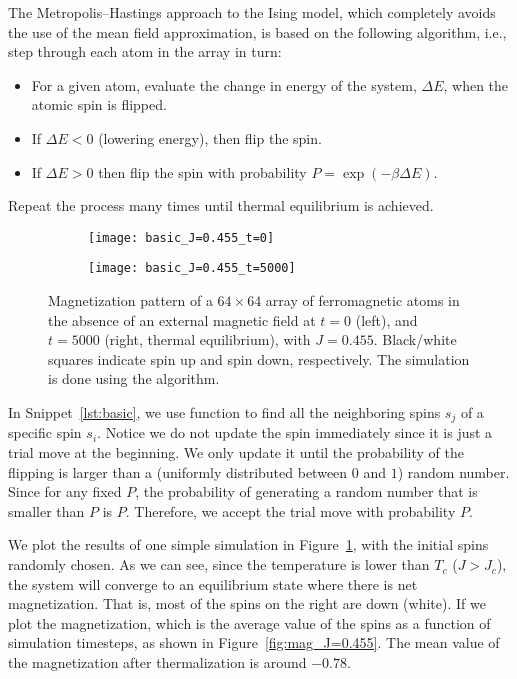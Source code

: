 The Metropolis--Hastings approach to the Ising model, which completely avoids the use of the mean
field approximation, is based on the following algorithm, i.e.,
step through each atom in the array in turn:
%
\begin{itemize}
    \item For a given atom, evaluate the change in energy of the system, \(\Delta E\), when
          the atomic spin is flipped.
    \item If \(\Delta E < 0\) (lowering energy), then flip the spin.
    \item If \(\Delta E > 0\) then flip the spin with probability
          \(P=\exp(-\beta \Delta E)\).
\end{itemize}
%
Repeat the process many times until thermal equilibrium is achieved.

\begin{figure}[hbt]
    \centering
    \begin{subfigure}{0.49\textwidth}
        \centering
        \texttt{[image: basic\_J=0.455\_t=0]}
    \end{subfigure}
    \hfill
    \begin{subfigure}{0.49\textwidth}
        \centering
        \texttt{[image: basic\_J=0.455\_t=5000]}
    \end{subfigure}
    \caption{Magnetization pattern of a \(64 \times 64\) array of ferromagnetic atoms in the
        absence of an external magnetic field at \(t = 0\) (left), and \(t = 5000\) (right,
        thermal equilibrium), with \(J = 0.455\). Black/white squares indicate spin up and
        spin down, respectively. The simulation is done using the  algorithm.}
    \label{fig:rand_J=0.455}
\end{figure}

In Snippet~\ref{lst:basic}, we use function  to find all the neighboring
spins \(s_j\) of a specific spin \(s_i\). Notice we do not update the spin immediately
since it is just a trial move at the beginning. We only update it until the probability of
the flipping is larger than a (uniformly distributed between \(0\) and \(1\)) random number.
Since for any fixed \(P\), the probability of generating a random number that is smaller
than \(P\) is \(P\). Therefore, we accept the trial move with probability \(P\).

We plot the results of one simple simulation in Figure~\ref{fig:rand_J=0.455},
with the initial spins randomly chosen.
As we can see, since the temperature is lower than \(T_c\) (\(J > J_c\)),
the system will converge to an equilibrium state where there is net magnetization.
That is, most of the spins on the right are down (white).
If we plot the magnetization, which is the average value of the spins as a function
of simulation timesteps, as shown in Figure~\ref{fig:mag_J=0.455}.
The mean value of the magnetization after thermalization is around \(-0.78\).

